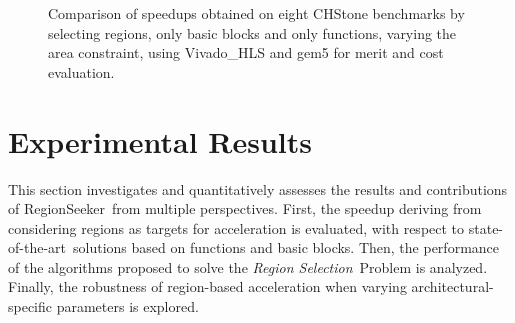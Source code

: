 \documentclass[]{usiinfthesis}
\newcommand{\rseeker}{{RegionSeeker}}
\newcommand{\SoTA}{{state-of-the-art}}
\newcommand{\rsprobname}{\emph{Region Selection}}
\begin{document}
\begin{figure}
{}
\caption{Comparison of speedups obtained on eight CHStone benchmarks
  by selecting regions, only basic blocks and only functions, varying
  the area constraint, using Vivado\_HLS and gem5 for merit and cost
  evaluation. }
\label{fig:regions_vivado}
\end{figure}

\section{Experimental Results}
\label{subsec:exp}

This section investigates and quantitatively assesses the results and
contributions of \rseeker\ from multiple perspectives. First, the speedup 
deriving from considering regions as targets for acceleration is evaluated, 
with respect to \SoTA\ solutions based on functions and basic blocks. Then, the
performance of the algorithms proposed to solve the \rsprobname\ Problem
is analyzed.  Finally, the robustness of region-based acceleration when varying
architectural-specific parameters is explored.\par
\end{document}
